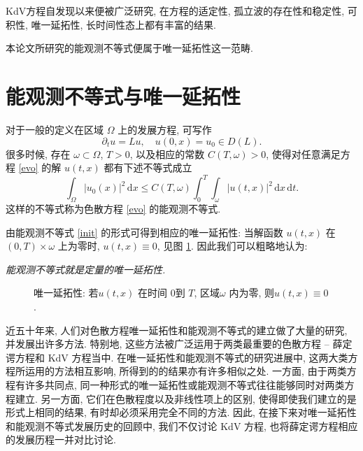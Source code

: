 \documentclass[master]{cugthesis}
\renewcommand\d{\ensuremath{\,\mathrm{d}}}
\begin{document}
    
    
    KdV方程自发现以来便被广泛研究, 在方程的适定性, 孤立波的存在性和稳定性, 可积性, 唯一延拓性, 长时间性态上都有丰富的结果. 
    
    本论文所研究的能观测不等式便属于唯一延拓性这一范畴.
    
    
    \section{能观测不等式与唯一延拓性}
    对于一般的定义在区域 $\Omega$ 上的发展方程, 可写作
    \begin{equation}\label{evo}
        \partial_t u = L u, \quad u(0,x)=u_0\in D(L).
    \end{equation}
    很多时候, 存在 $\omega\subset \Omega$, $T>0$, 以及相应的常数 $C(T,\omega)>0$, 使得对任意满足方程 \eqref{evo} 的解 $u(t,x)$ 都有下述不等式成立
    \begin{equation}\label{init}
        \int_{\Omega}|u_0(x)|^2\d x\le C(T,\omega)\int_0^T\int_\omega|u(t,x)|^2\d x\d t.
    \end{equation}
    这样的不等式称为色散方程 \eqref{evo} 的能观测不等式. 

    
    由能观测不等式 \eqref{init} 的形式可得到相应的唯一延拓性: 当解函数 $u(t,x)$ 在 $(0,T)\times \omega$ 上为零时, $u(t,x)\equiv 0$, 见图 \ref{fig2}. 因此我们可以粗略地认为:
    \begin{center}
        \itshape 能观测不等式就是定量的唯一延拓性.
    \end{center}
    \begin{figure}[ht]
    \centering
    \caption{唯一延拓性: 若$u(t,x)$ 在时间 $0$到 $T$, 区域$\omega$ 内为零, 则$u(t,x)\equiv 0$.}
    \label{fig2}
  \end{figure}
    
    近五十年来, 人们对色散方程唯一延拓性和能观测不等式的建立做了大量的研究, 并发展出许多方法. 特别地, 这些方法被广泛运用于两类最重要的色散方程 -- 薛定谔方程和 KdV 方程当中. 在唯一延拓性和能观测不等式的研究进展中, 这两大类方程所运用的方法相互影响, 所得到的的结果亦有许多相似之处. 一方面, 由于两类方程有许多共同点, 同一种形式的唯一延拓性或能观测不等式往往能够同时对两类方程建立. 另一方面, 它们在色散程度以及非线性项上的区别, 使得即使我们建立的是形式上相同的结果, 有时却必须采用完全不同的方法. 
    因此, 在接下来对唯一延拓性和能观测不等式发展历史的回顾中, 我们不仅讨论 KdV 方程, 也将薛定谔方程相应的发展历程一并对比讨论.
\end{document}
